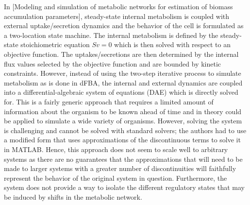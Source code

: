 In [Modeling and simulation of metabolic networks for estimation of
biomass accumulation parameters], steady-state internal metabolism is coupled with external uptake/secretion dynamics and the behavior of the cell is formulated as a two-location state machine. The internal metabolism is defined by the steady-state stoichiometric equation $Sv = 0$ which is then solved with respect to an objective function. The uptakes/secretions are then determined by the internal flux values selected by the objective function and are bounded by kinetic constraints. However, instead of using the two-step iterative process to simulate metabolism as is done in dFBA, the internal and external dynamics are coupled into a differential-algebraic system of equations (DAE) which is directly solved for. This is a fairly generic approach that requires a limited amount of information about the organism to be known ahead of time and in theory could be applied to simulate a wide variety of organisms. However, solving the system is challenging and cannot be solved with standard solvers; the authors had to use a modified form that uses approximations of the discontinuous terms to solve it in MATLAB. Hence, this approach does not seem to scale well to arbitrary systems as there are no guarantees that the approximations that will need to be made to larger systems with a greater number of discontinuities will faithfully represent the behavior of the original system in question. Furthermore, the system does not provide a way to isolate the different regulatory states that may be induced by shifts in the metabolic network.


